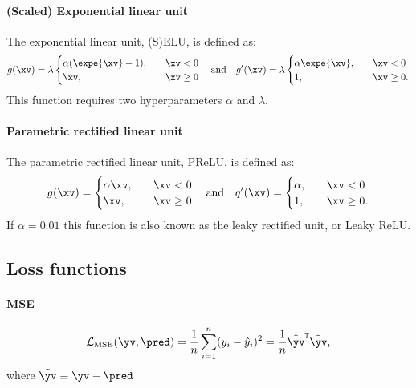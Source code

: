         \paragraph{(Scaled) Exponential linear unit}
            The exponential linear unit, (S)ELU, is defined as:
            \begin{equation}
                g(\xv) = \lambda
                \begin{cases}
                    \alpha(\expe{\xv}-1), \quad & \xv < 0 \\
                    \xv, \quad & \xv \geq 0
                \end{cases}
                \quad \mathrm{and} \quad
                g'(\xv) = \lambda
                \begin{cases}
                    \alpha\expe{\xv}, \quad & \xv < 0 \\
                    1, \quad & \xv \geq 0.
                \end{cases}
            \end{equation}
            This function requires two hyperparameters $\alpha$ and $\lambda$.

        \paragraph{Parametric rectified linear unit}
            The parametric rectified linear unit, PReLU, is defined as:
            \begin{equation}
                g(\xv) = 
                \begin{cases}
                    \alpha \xv, \quad & \xv<0 \\
                    \xv, \quad & \xv\geq 0
                \end{cases}
                \quad \mathrm{and} \quad
                q'(\xv) = 
                \begin{cases}
                    \alpha, \quad & \xv<0 \\
                    1, \quad & \xv\geq 0.
                \end{cases}
            \end{equation}
            If $\alpha=0.01$ this function is also known as the leaky rectified unit, or Leaky ReLU. 
    \subsection{Loss functions}
        \paragraph{MSE}
            \begin{equation}
                \mathcal{L}_\mathrm{MSE}(\yv, \pred) = \frac{1}{n}\sum_{i=1}^n(y_i-\hat{y}_i)^2 = \frac{1}{n}\tilde{\yv}^\mathtt{T}\tilde{\yv},
            \end{equation}
            where $\tilde{\yv} \equiv \yv-\pred$

